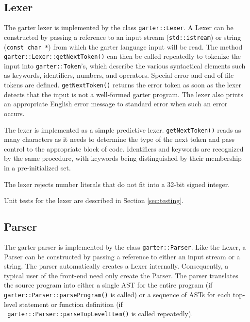 \documentclass[11pt]{article}
\begin{document}
\subsection{Lexer}

\label{sec:Lexer}

The garter lexer is implemented by the class {\tt garter::Lexer}.  A Lexer can
be constructed by passing a reference to an input stream ({\tt std::istream}) or
string ({\tt const char *}) from which the garter language input will be read.  The method {\tt
garter::Lexer::getNextToken()} can then be called repeatedly to tokenize the
input into {\tt garter::Token}'s, which describe the various syntactical
elements such as keywords, identifiers, numbers, and operators.  Special error
and end-of-file tokens are defined.  {\tt getNextToken()} returns the error
token as soon as the lexer detects that the input is not a well-formed garter
program.  The lexer also prints an appropriate English error message to standard
error when such an error occurs.

The lexer is implemented as a simple predictive lexer.  {\tt getNextToken()}
reads as many characters as it needs to determine the type of the next token and
pass control to the appropriate block of code.  Identifiers and keywords are
recognized by the same procedure, with keywords being distinguished by their
membership in a pre-initialized set.

The lexer rejects number literals that do not fit into a 32-bit signed integer.

Unit tests for the lexer are described in Section \ref{sec:testing}.

\subsection{Parser}

\label{sec:Parser}

The garter parser is implemented by the class {\tt garter::Parser}.  Like the
Lexer, a Parser can be constructed by passing a reference to either an input
stream or a string.  The parser automatically creates a Lexer internally.
Consequently, a typical user of the front-end need only create the Parser.  The
parser translates the source program into either a single AST for the entire
program (if {\tt garter::Parser::parseProgram()} is called) or a sequence of
ASTs for each top-level statement or function definition (if \\{\tt
garter::Parser::parseTopLevelItem()} is called repeatedly).
\end{document}
